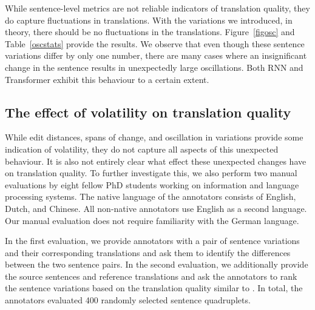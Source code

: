 While sentence-level metrics are not reliable indicators of translation quality, they do capture fluctuations in translations.  
With the variations we introduced, in theory, there should be no fluctuations in the translations. 
Figure~\ref{figosc} and Table~\ref{oscstats} provide the results. 
We observe that even though these sentence variations differ by only one number, there are many cases where an insignificant change in the sentence results in unexpectedly large oscillations. Both RNN and Transformer exhibit this behaviour to a certain extent. 


\subsection{The effect of volatility on translation quality}

While edit distances, spans of change, and oscillation in variations provide some indication of volatility, they do not capture all aspects of this unexpected behaviour. 
It is also not entirely clear what effect these unexpected changes have on translation quality.
To further investigate this, we also perform two manual evaluations by eight fellow PhD students working on information and language processing systems.
The native language of the annotators consists of English, Dutch, and Chinese. 
All non-native annotators use English as a second language.
Our manual evaluation does not require familiarity with the German language.

In the first evaluation, we provide annotators with a pair of sentence variations and their corresponding translations
and ask them to identify the differences between the two sentence pairs.
In the second evaluation, we additionally provide the source sentences and reference translations and ask the annotators to rank the sentence variations based on the translation quality similar to \citet{bojar-EtAl:2016:WMT1}.
In total, the annotators evaluated 400 randomly selected sentence quadruplets. 
 
